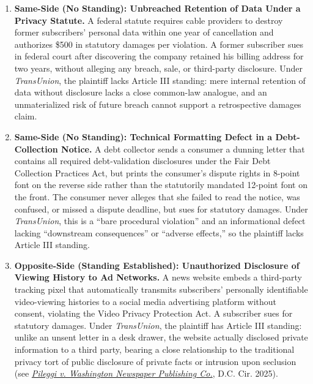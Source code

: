 \documentclass[12pt]{article}
\begin{document}
\begin{enumerate}
\item \textbf{Same-Side (No Standing): Unbreached Retention of Data Under a Privacy Statute.} A federal statute requires cable providers to destroy former subscribers' personal data within one year of cancellation and authorizes \$500 in statutory damages per violation. A former subscriber sues in federal court after discovering the company retained his billing address for two years, without alleging any breach, sale, or third-party disclosure. Under \textit{TransUnion}, the plaintiff lacks Article III standing: mere internal retention of data without disclosure lacks a close common-law analogue, and an unmaterialized risk of future breach cannot support a retrospective damages claim.

\item \textbf{Same-Side (No Standing): Technical Formatting Defect in a Debt-Collection Notice.} A debt collector sends a consumer a dunning letter that contains all required debt-validation disclosures under the Fair Debt Collection Practices Act, but prints the consumer's dispute rights in 8-point font on the reverse side rather than the statutorily mandated 12-point font on the front. The consumer never alleges that she failed to read the notice, was confused, or missed a dispute deadline, but sues for statutory damages. Under \textit{TransUnion}, this is a ``bare procedural violation'' and an informational defect lacking ``downstream consequences'' or ``adverse effects,'' so the plaintiff lacks Article III standing.

\item \textbf{Opposite-Side (Standing Established): Unauthorized Disclosure of Viewing History to Ad Networks.} A news website embeds a third-party tracking pixel that automatically transmits subscribers' personally identifiable video-viewing histories to a social media advertising platform without consent, violating the Video Privacy Protection Act. A subscriber sues for statutory damages. Under \textit{TransUnion}, the plaintiff has Article III standing: unlike an unsent letter in a desk drawer, the website actually disclosed private information to a third party, bearing a close relationship to the traditional privacy tort of public disclosure of private facts or intrusion upon seclusion (see \href{https://media.cadc.uscourts.gov/opinions/docs/2025/08/24-7022-2129694.pdf}{\textit{Pileggi v. Washington Newspaper Publishing Co.}}, D.C. Cir. 2025).


\end{enumerate}
\end{document}
